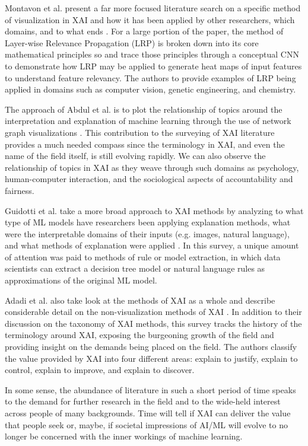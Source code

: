 \documentclass{IEEEtran}
\begin{document}
Montavon et al. present a far more focused literature search on a specific method of visualization in XAI and how it has been applied by other researchers, which domains, and to what ends \cite{MONTAVON20181}.  For a large portion of the paper, the method of Layer-wise Relevance Propagation (LRP) is broken down into its core mathematical principles so and trace those principles through a conceptual CNN to demonstrate how LRP may be applied to generate heat maps of input features to understand feature relevancy.  The authors to provide examples of LRP being applied in domains such as computer vision, genetic engineering, and chemistry.

The approach of Abdul et al. is to plot the relationship of topics around the interpretation and explanation of machine learning through the use of network graph visualizations \cite{Abdul:2018:TTE:3173574.3174156}.  This contribution to the surveying of XAI literature provides a much needed compass since the terminology in XAI, and even the name of the field itself, is still evolving rapidly.  We can also observe the relationship of topics in XAI as they weave through such domains as psychology, human-computer interaction, and the sociological aspects of accountability and fairness.

Guidotti et al. take a more broad approach to XAI methods by analyzing to what type of ML models have researchers been applying explanation methods, what were the interpretable domains of their inputs (e.g. images, natural language), and what methods of explanation were applied \cite{Guidotti:2018:SME:3271482.3236009}.  In this survey, a unique amount of attention was paid to methods of rule or model extraction, in which data scientists can extract a decision tree model or natural language rules as approximations of the original ML model.

Adadi et al. also take look at the methods of XAI as a whole and describe considerable detail on the non-visualization methods of XAI \cite{Adadi2018}.  In addition to their discussion on the taxonomy of XAI methods, this survey tracks the history of the terminology around XAI, exposing the burgeoning growth of the field and providing insight on the demands being placed on the field.  The authors classify the value provided by XAI into four different areas: explain to justify, explain to control, explain to improve, and explain to discover.

In some sense, the abundance of literature in such a short period of time speaks to the demand for further research in the field and to the wide-held interest across people of many backgrounds.  Time will tell if XAI can deliver the value that people seek or, maybe, if societal impressions of AI/ML will evolve to no longer be concerned with the inner workings of machine learning.
\end{document}
